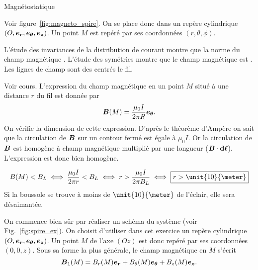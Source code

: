 \begin{corr}{Magnétostatique}
\begin{corrlist}
\item Voir figure~\ref{fig:magneto_spire}. On se place donc dans un repère cylindrique
      $(O, \er, \etheta, \ez)$. Un point $M$ est repéré par ses coordonnées 
      $(r, \theta, \phi)$.

\item  L'étude
      des invariances de la distribution de courant montre que la norme du 
      champ magnétique . L'étude des
      symétries montre que le champ magnétique est .
      Les lignes de champ sont des  centrés le fil.

\item Voir cours. L'expression du champ magnétique en un point $M$ situé 
  à une distance $r$ du fil est donnée par
  \begin{equation*}
	  \vecb(M) = \dfrac{\mu_0 I}{2 \pi R} \etheta.
   \end{equation*}
   On vérifie la dimension de cette expression. D'après le théorème d'Ampère
   on sait que la circulation de $\vecb$ sur un contour fermé est égale à 
   $\mu_0 I$. Or la circulation de $\vecb$ est homogène à champ magnétique 
   multiplié par une longueur ($\vecb \cdot \dl$). L'expression est donc bien homogène.

   \item 
	   \begin{equation*}
		B(M) < B_L \iff \dfrac{\mu_0 I}{2 \pi r} < B_L \iff 
		r > \dfrac{\mu_0 I}{2 \pi B_L} \iff \boxed{r > \unit{10}{\meter}} 
	   \end{equation*}
	Si la boussole se trouve à moins de $\unit{10}{\meter}$ de l'éclair, 
	elle sera désaimantée.
\end{corrlist}


	\begin{corrlist}
		\item On commence bien sûr par réaliser un schéma du système
			(voir Fig.~\ref{fig:spire_ex}).
		      On choisit d'utiliser dans cet exercice un repère cylindrique
		      $(O, \er, \etheta, \ez)$. Un point $M$ de l'axe $(Oz)$
		      est donc repéré par ses coordonnées $(0, 0, z)$. Sous
		      sa forme la plus générale, le champ magnétique en $M$ 
		      s'écrit 
		      \begin{equation*}
			      \vecb_1(M) = B_r(M) \er + B_\theta(M) \etheta +
			      B_z(M) \ez.
		      \end{equation*}


\end{corrlist}
\end{corr}
